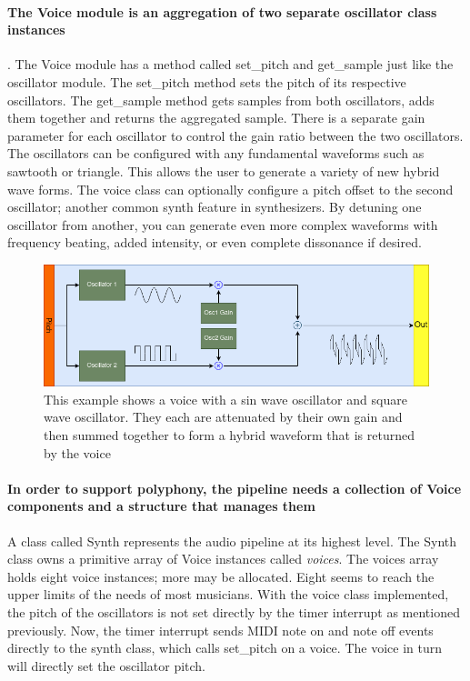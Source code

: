 \documentclass[acmlarge,screen]{acmart}
\begin{document}
	\paragraph{The Voice module is an aggregation of two separate oscillator class instances}. The Voice module has a method called set\_pitch and get\_sample just like the oscillator module. The set\_pitch method sets the pitch of its respective oscillators. The get\_sample method gets samples from both oscillators, adds them together and returns the aggregated sample. There is a separate gain parameter for each oscillator to control the gain ratio between the two oscillators. The oscillators can be configured with any fundamental waveforms such as sawtooth or triangle. This allows the user to generate a variety of new hybrid wave forms. The voice class can optionally configure a pitch offset to the second oscillator; another common synth feature in synthesizers. By detuning one oscillator from another, you can generate even more complex waveforms with frequency beating, added intensity, or even complete dissonance if desired.
	
	\begin{figure}[H]
		\includegraphics[width=\linewidth]{simple_voice}
		\caption{This example shows a voice with a sin wave oscillator and square wave oscillator. They each are attenuated by their own gain and then summed together to form a hybrid waveform that is returned by the voice}
		\centering
	\end{figure}
	
	\paragraph{In order to support polyphony, the pipeline needs a collection of Voice components and a structure that manages them} A class called Synth represents the audio pipeline at its highest level. The Synth class owns a primitive array of Voice instances called \textit{voices}. The voices array holds eight voice instances; more may be allocated. Eight seems to reach the upper limits of the needs of most musicians. With the voice class implemented, the pitch of the oscillators is not set directly by the timer interrupt as mentioned previously. Now, the timer interrupt sends MIDI note on and note off events directly to the synth class, which calls set\_pitch on a voice. The voice in turn will directly set the oscillator pitch.
	
\end{document}
